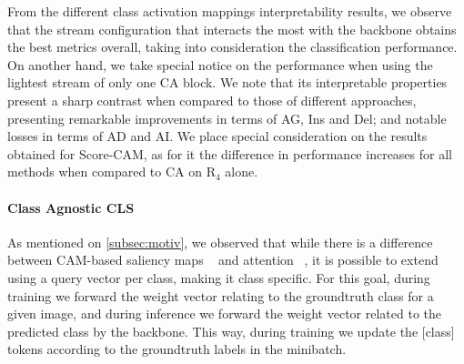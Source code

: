    From the different class activation mappings interpretability results, we observe that the stream configuration that interacts the most with the backbone obtains the best metrics overall, taking into consideration the classification performance. On another hand, we take special notice on the performance when using the lightest stream of only one CA block. We note that its interpretable properties present a sharp contrast when compared to those of different approaches, presenting remarkable improvements in terms of AG, Ins and Del; and notable losses in terms of AD and AI. We place special consideration on the results obtained for Score-CAM, as for it the difference in performance increases for all methods when compared to CA on R$_4$ alone.%
    \paragraph{Class Agnostic CLS}
    As mentioned on \autoref{subsec:motiv}, we observed that while there is a difference between CAM-based saliency maps ~ and attention ~, it is possible to extend ~ using a query vector per class, making it class specific. For this goal, during training we forward the weight vector relating to the groundtruth class for a given image, and during inference we forward the weight vector related to the predicted class by the backbone. This way, during training we update the [class] tokens according to the groundtruth labels in the minibatch.

